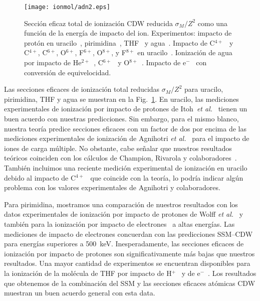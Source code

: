 \begin{figure}
\centering
\texttt{[image: ionmol/adn2.eps]}
\caption[Sección eficaz total de ionización reducida por $Z$ (Parte II).]
{Sección eficaz total de ionización CDW reducida $\sigma_{M}/Z^2$ como 
una función de la energía de impacto del ion. Experimentos: impacto de 
protón en uracilo~\cite{itoh2013}, pirimidina~\cite{wolff2014}, 
THF~\cite{wang2016} y agua~\cite{Luna2007,Bolorizadeh86,H_Rudd85,toburen80}. 
Impacto de C$^{4+}$~\cite{Sens:20} y C$^{4+}$, C$^{6+}$, O$^{6+}$, F$^{6+}$, 
O$^{8+}$, y F$^{8+}$ en uracilo~\cite{agnihotri2012,agnihotri2013}. 
Ionización de agua por impacto de He$^{2+}$~\cite{Ohsawa05,He_Rudd85,
toburen80}, C$^{6+}$~\cite{DalCappello2009,Bhattacharjee:17} y 
O$^{8+}$~\cite{Bhattacharjee:16}. Impacto de e$^-$~\cite{bug2017,wolf2019,
fuss2009} con conversión de equivelocidad.}
\label{fig:crossDNA_2}
\end{figure} 

Las secciones eficaces de ionización total reducidas $\sigma_M/Z^2$ 
para uracilo, pirimidina, THF y agua se muestran en la 
Fig.~\ref{fig:crossDNA_2}. En uracilo, las mediciones experimentales de 
ionización por impacto de protones de Itoh~\textit{et al.}~\cite{itoh2013} 
tienen un buen acuerdo con nuestras predicciones. Sin embargo, para el 
mismo blanco, nuestra teoría predice secciones eficaces con un factor 
de dos por encima de las mediciones experimentales de ionización de 
Agnihotri \textit{et al.}~\cite{agnihotri2012,agnihotri2013} para el 
impacto de iones de carga múltiple. No obstante, cabe señalar que 
nuestros resultados teóricos coinciden con los cálculos de Champion, 
Rivarola y colaboradores~\cite{agnihotri2012,champion2012}. También 
incluimos una reciente medición experimental de ionización en uracilo
debido al impacto de C$^{4+}$~\cite{Sens:20} que coincide con la teoría, 
lo podría indicar algún problema con los valores experimentales de 
Agnihotri y colaboradores.

Para pirimidina, mostramos una comparación de nuestros resultados con 
los datos experimentales de ionización por impacto de protones de 
Wolff \textit{et al.}~\cite{wolff2014} y también para la ionización por 
impacto de electrones~\cite{bug2017} a altas energías. Las mediciones de 
impacto de electrones concuerdan con las predicciones SSM--CDW para 
energías superiores a 500~keV. Inesperadamente, las secciones eficaces de 
ionización por impacto de protones son significativamente más bajas que 
nuestros resultados. Una mayor cantidad de experimentos se encuentran 
disponibles para la ionización de la molécula de THF por impacto de 
H$^+$~\cite{wang2016} y de e$^-$~\cite{bug2017,wolf2019,fuss2009}. Los 
resultados que obtenemos de la combinación del SSM y las secciones 
eficaces atómicas CDW muestran un buen acuerdo general con esta data.

